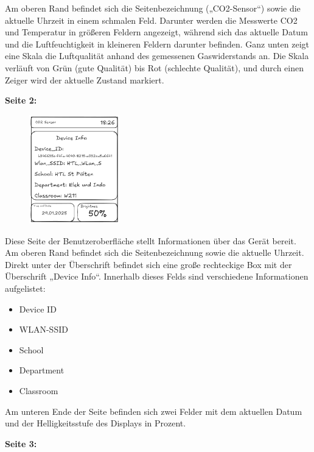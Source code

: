 \begin{inhalt}
Am oberen Rand befindet sich die Seitenbezeichnung („CO2-Sensor“) sowie die aktuelle Uhrzeit in einem schmalen Feld. Darunter werden die Messwerte CO2 und Temperatur in größeren Feldern angezeigt, während sich das aktuelle Datum und die Luftfeuchtigkeit in kleineren Feldern darunter befinden. Ganz unten zeigt eine Skala die Luftqualität anhand des gemessenen Gaswiderstands an. Die Skala verläuft von Grün (gute Qualität) bis Rot (schlechte Qualität), und durch einen Zeiger wird der aktuelle Zustand markiert.

\begin{center}
    \textbf{Seite 2:}
\end{center}

\begin{figure}[!htb]
\centering
\includegraphics[width=0.35\textwidth]{files/Tobias/pics/Skizzen/Screen2_Info.png}
\caption[Display Interface Skizze (Seite 2)]{}
\label{fig:display_skizze_seite_2}
\end{figure}

Diese Seite der Benutzeroberfläche stellt Informationen über das Gerät bereit. Am oberen Rand befindet sich die Seitenbezeichnung sowie die aktuelle Uhrzeit. Direkt unter der Überschrift befindet sich eine große rechteckige Box mit der Überschrift „Device Info“. Innerhalb dieses Felds sind verschiedene Informationen aufgelistet:
\begin{itemize}
    \item Device ID
    \item WLAN-SSID
    \item School
    \item Department
    \item Classroom
\end{itemize}

Am unteren Ende der Seite befinden sich zwei Felder mit dem aktuellen Datum und der Helligkeitsstufe des Displays in Prozent.

\begin{center}
    \textbf{Seite 3:}
\end{center}


\end{inhalt}
